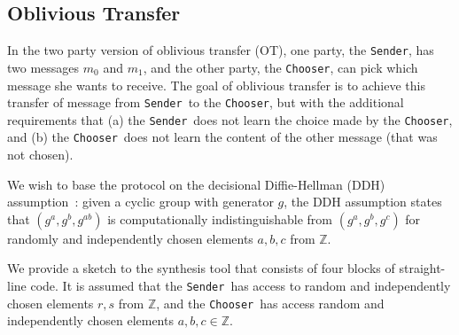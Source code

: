 \documentclass[preprint]{sig-alternate-05-2015}
\def\sender{{\tt{Sender}}}
\def\chooser{{\tt{Chooser}}}
\begin{document}
\subsection{Oblivious Transfer}

In the two party version of oblivious transfer (OT), 
one party, the \sender, has two messages $m_0$ and $m_1$,
and the other party, the \chooser, can pick which message she wants to receive.
The goal of oblivious transfer is to achieve this transfer of
message from \sender\ to the \chooser, but with the additional
requirements that
(a) the \sender\ does not learn the choice made by the \chooser,
and
(b) the \chooser\ does not learn the content of the other message 
(that was not chosen).

We wish to base the protocol on the decisional Diffie-Hellman (DDH) assumption~\cite{Boneh:DDH}:
given a cyclic group with generator $g$, the DDH assumption states that
$(g^a,g^b,g^{ab})$ is computationally indistinguishable from
$(g^a,g^b,g^c)$ for randomly and independently chosen elements $a,b,c$ from $\mathbb{Z}$.


We provide a sketch to the synthesis tool that consists of four blocks of straight-line code.
It is assumed that the \sender\ has access to random and independently chosen elements 
$r,s$ from $\mathbb{Z}$, and the \chooser\ has access random and independently chosen
elements $a,b,c\in\mathbb{Z}$.
\end{document}
